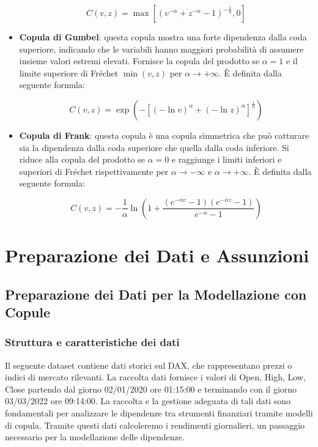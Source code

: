 \documentclass[%
	corpo=11pt,
    twoside,
    stile=classica,
    oldstyle,
    tipotesi=custom,
    greek,
    evenboxes,
]{toptesi}
\begin{document}
\begin{itemize}
	\[
	C(v,z) = \max[(v^{-\alpha} + z^{-\alpha} - 1)^{-\frac{1}{\alpha}}, 0]
	\]
	
	\item \textbf{Copula di Gumbel}: questa copula mostra una forte dipendenza dalla coda superiore, indicando che le variabili hanno maggiori probabilità di assumere insieme valori estremi elevati. Fornisce la copula del prodotto se \( \alpha = 1 \) e il limite superiore di Fréchet \( \min(v,z) \) per \( \alpha \to +\infty \). È definita dalla seguente formula:
	
	\[
	C(v,z) = \exp \left( -[(-\ln v)^\alpha + (-\ln z)^\alpha]^{\frac{1}{\alpha}} \right)
	\]
	
	\item \textbf{Copula di Frank}: questa copula è una copula simmetrica che può catturare sia la dipendenza dalla coda superiore che quella dalla coda inferiore. Si riduce alla copula del prodotto se \( \alpha = 0 \) e raggiunge i limiti inferiori e superiori di Fréchet rispettivamente per \( \alpha \to -\infty \) e \( \alpha \to +\infty \). È definita dalla seguente formula:
	
	\[
	C(v,z) = -\frac{1}{\alpha} \ln \left( 1 + \frac{(e^{-\alpha v} - 1)(e^{-\alpha z} - 1)}{e^{-\alpha} - 1} \right)
	\]
	
\end{itemize}




\part{Preparazione dei Dati e Assunzioni}

\chapter{Preparazione dei Dati per la Modellazione con Copule}

\section{Struttura e caratteristiche dei dati}

Il seguente dataset contiene dati storici sul DAX, che rappresentano prezzi o indici di mercato rilevanti. La raccolta dati fornisce i valori di Open, High, Low, Close partendo dal giorno 02/01/2020 ore 01:15:00 e terminando con il giorno 03/03/2022 ore 09:14:00. La raccolta e la gestione adeguata di tali dati sono fondamentali per analizzare le dipendenze tra strumenti finanziari tramite modelli di copula. Tramite questi dati calcoleremo i rendimenti giornalieri, un passaggio necessario per la modellazione delle dipendenze.
\end{document}
